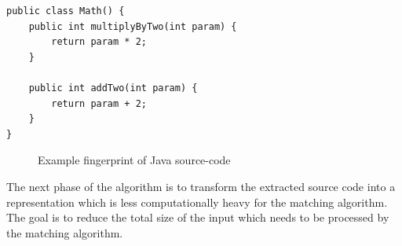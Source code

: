 \newsavebox{\firstlisting}
\begin{lrbox}{\firstlisting}
\begin{lstlisting}
public class Math() {
    public int multiplyByTwo(int param) {
        return param * 2;
    }

    public int addTwo(int param) {
        return param + 2;
    }
}
\end{lstlisting}
\end{lrbox}
\begin{figure}[htp]
	\begin{center}
        \hspace{1cm}

        \vspace{0.5cm}
	\end{center}
	\caption{Example fingerprint of Java source-code}
	\label{fig:fingerprint}
\end{figure}

The next phase of the algorithm is to transform the extracted source code into a
representation which is less computationally heavy for the matching algorithm. The goal is
to reduce the total size of the input which needs to be processed by the matching
algorithm.

